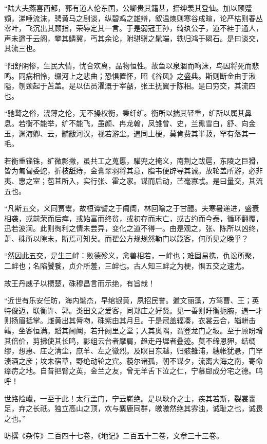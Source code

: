 \documentclass[12pt,UTF8]{ctexbook}
\begin{document}
“陆大夫燕喜西都，郭有道人伦东国，公卿贵其籍甚，搢绅羡其登仙。加以颐蹙頞，涕唾流沫，骋黄马之剧谈，纵碧鸡之雄辩，叙温燠则寒谷成暄，论严枯则春丛零叶，飞沉出其顾指，荣辱定其一言。于是弱冠王孙，绮纨公子，道不絓于通人，声未遒于云阁，攀其鳞翼，丐其余论，附骐骥之髦端，轶归鸿于碣石。是曰谈交，其流三也。

“阳舒阴惨，生民大情，忧合欢离，品物恒性。故鱼以泉涸而呴沫，鸟因将死而悲鸣。同病相怜，缀河上之悲曲；恐惧置怀，昭《谷风》之盛典。斯则断金由于湫隘，刎颈起于苫盖。是以伍员濯溉于宰嚭，张王抚翼于陈相。是曰穷交，其流四也。

“驰鹜之俗，浇薄之伦，无不操权衡，秉纤纩。衡所以揣其轻重，纩所以属其鼻息。若衡不能举，纩不能飞，虽颜、冉龙翰，凤雏曾、史，兰熏雪白，舒、向金玉，渊海卿、云，黼黻河汉，视若游尘。遇同土梗，莫肯费其半菽，罕有落其一毛。

若衡重锱铢，纩微彯撇，虽共工之蒐慝，驩兜之掩义，南荆之跋扈，东陵之巨猾，皆为匍匐委蛇，折枝舐痔，金膏翠羽将其意，脂韦便辟导其诚。故轮盖所游，必非夷、惠之室；苞苴所入，实行张、霍之家。谋而后动，芒毫寡忒。是曰量交，其流五也。

“凡斯五交，义同贾鬻，故桓谭譬之于阛阓，林回喻之于甘醴。夫寒暑递进，盛衰相袭，或前荣而后瘁，或始富而终贫，或初存而末亡，或古约而今泰，循环翻覆，迅若波澜。此则徇利之情未尝异，变化之道不得一。由是观之，张、陈所以凶终，萧、硃所以隙末，断焉可知矣。而翟公方规规然勒门以箴客，何所见之晚乎？

“然因此五交，是生三衅：败德殄义，禽兽相若，一衅也；难固易携，仇讼所聚，二衅也；名陷饕餮，贞介所羞，三衅也。古人知三衅之为梗，惧五交之速尤。

故王丹威子以槚楚，硃穆昌言而示绝，有旨哉！

“近世有乐安任昉，海内髦杰，早绾银黄，夙招民誉。遒文丽藻，方驾曹、王；英特俊迈，联衡许、郭。类田文之爱客，同郑庄之好贤。见一善则盱衡扼腕，遇一才则扬眉抵掌。雌黄出其脣吻，硃紫由其月旦。于是冠盖辐凑，衣裳云合，辎軿击轊，坐客恒满。蹈其阃阈，若升阙里之堂；入其奥隅，谓登龙门之坂。至于顾盼增其倍价，剪拂使其长鸣，彯组云台者摩肩，趋走丹墀者叠迹。莫不缔恩狎，结绸缪，想惠、庄之清尘，庶羊、左之徽烈。及瞑目东越，归骸雒浦，繐帐犹悬，门罕渍酒之彦；坟未宿草，野绝动轮之宾。藐尔诸孤，朝不谋夕，流离大海之南，寄命瘴疠之地。自昔把臂之英，金兰之友，曾无羊舌下泣之仁，宁慕郈成分宅之德。呜呼！

世路险巇，一至于此！太行孟门，宁云崭绝。是以耿介之士，疾其若斯，裂裳裹足，弃之长祇。独立高山之顶，欢与麋鹿同群，皦皦然绝其雰浊，诚耻之也，诚畏之也。”

昉撰《杂传》二百四十七卷，《地记》二百五十二卷，文章三十三卷。
\end{document}
